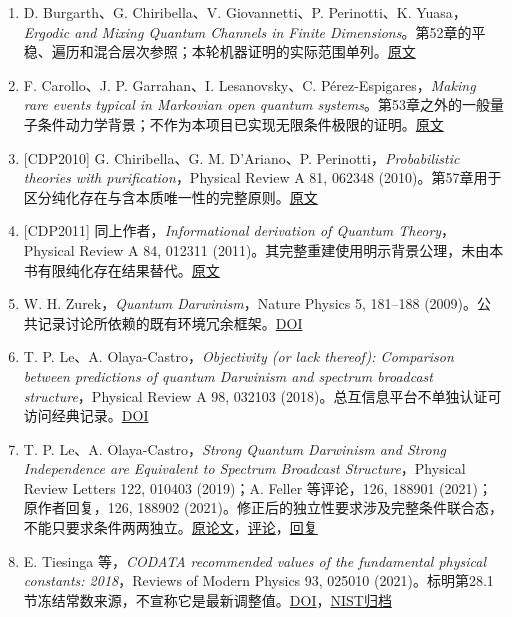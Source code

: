 \documentclass[
  11pt,
  oneside]{book}
\begin{document}
\begin{enumerate}
{  bound states in quantum
  wires}。同一应用方向的独立理论先例。\href{https://arxiv.org/abs/1003.1145}{原文}
\item
  D. Burgarth、G. Chiribella、V. Giovannetti、P. Perinotti、K.
  Yuasa，\emph{Ergodic and Mixing Quantum Channels in Finite
  Dimensions}。第52章的平稳、遍历和混合层次参照；本轮机器证明的实际范围单列。\href{https://arxiv.org/abs/1210.5625}{原文}
\item
  F. Carollo、J. P. Garrahan、I. Lesanovsky、C.
  Pérez-Espigares，\emph{Making rare events typical in Markovian open
  quantum
  systems}。第53章之外的一般量子条件动力学背景；不作为本项目已实现无限条件极限的证明。\href{https://arxiv.org/abs/1711.10951}{原文}
\item
  {[}CDP2010{]} G. Chiribella、G. M. D'Ariano、P.
  Perinotti，\emph{Probabilistic theories with purification}，Physical
  Review A 81, 062348
  (2010)。第57章用于区分纯化存在与含本质唯一性的完整原则。\href{https://arxiv.org/abs/0908.1583}{原文}
\item
  {[}CDP2011{]} 同上作者，\emph{Informational derivation of Quantum
  Theory}，Physical Review A 84, 012311
  (2011)。其完整重建使用明示背景公理，未由本书有限纯化存在结果替代。\href{https://arxiv.org/abs/1011.6451}{原文}
\item
  W. H. Zurek，\emph{Quantum Darwinism}，Nature Physics 5, 181--188
  (2009)。公共记录讨论所依赖的既有环境冗余框架。\href{https://doi.org/10.1038/nphys1202}{DOI}
\item
  T. P. Le、A. Olaya-Castro，\emph{Objectivity (or lack thereof):
  Comparison between predictions of quantum Darwinism and spectrum
  broadcast structure}，Physical Review A 98, 032103
  (2018)。总互信息平台不单独认证可访问经典记录。\href{https://doi.org/10.1103/PhysRevA.98.032103}{DOI}
\item
  T. P. Le、A. Olaya-Castro，\emph{Strong Quantum Darwinism and Strong
  Independence are Equivalent to Spectrum Broadcast Structure}，Physical
  Review Letters 122, 010403 (2019)；A. Feller 等评论，126, 188901
  (2021)；原作者回复，126, 188902
  (2021)。修正后的独立性要求涉及完整条件联合态，不能只要求条件两两独立。\href{https://doi.org/10.1103/PhysRevLett.122.010403}{原论文}，\href{https://doi.org/10.1103/PhysRevLett.126.188901}{评论}，\href{https://doi.org/10.1103/PhysRevLett.126.188902}{回复}
\item
  E. Tiesinga 等，\emph{CODATA recommended values of the fundamental
  physical constants: 2018}，Reviews of Modern Physics 93, 025010
  (2021)。标明第28.1节冻结常数来源，不宣称它是最新调整值。\href{https://doi.org/10.1103/RevModPhys.93.025010}{DOI}，\href{https://physics.nist.gov/cuu/Constants/archive2018.html}{NIST归档}
\end{enumerate}
\end{document}
